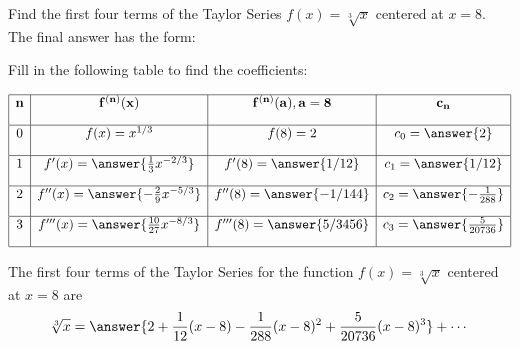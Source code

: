 \documentclass{ximera}
\begin{document}
\begin{problem} Find the first four terms of the Taylor Series $f(x) = \sqrt[3] x$ centered at $x = 8$.\\

The final answer has the form:
\begin{center}
\begin{multipleChoice}
\end{multipleChoice}
\end{center}

Fill in the following table to find the coefficients:

\[
\begin{array}{|c|c|c|c|} 
\hline
\bf{n} & \bf{f^{(n)}(x)} & \bf{f^{(n)}(a), a = 8} & \bf{c_n} \\[1em] 
\hline
 0 & f(x) = x^{1/3} & f(8) = 2 & c_0 = \answer{2} \\[1em]
\hline
1 & f'(x) = \answer{\frac13 x^{-2/3}} & f'(8) = \answer{1/12} & c_1 = \answer{1/12} \\[1em]
\hline
 2 & f''(x) =\answer{-\frac29 x^{-5/3}} & f''(8) = \answer{-1/144} & c_2 = \answer{-\frac{1}{288}} \\[1em]
\hline
 3 & f'''(x) =\answer{\frac{10}{27} x^{-8/3}} & f'''(8) = \answer{5/3456 } & c_3 = \answer{\frac{5}{20736}}\\[1em]
\hline
\end{array}
\]


The first four terms of the Taylor Series for the function $f(x) = \sqrt[3] x$ centered at $x = 8$ are
\[
\sqrt[3] x = \answer{2 + \frac{1}{12}(x-8) -\frac{1}{288}(x-8)^2 + \frac{5}{20736}(x-8)^3} + \cdots
\]


\end{problem}
\end{document}
